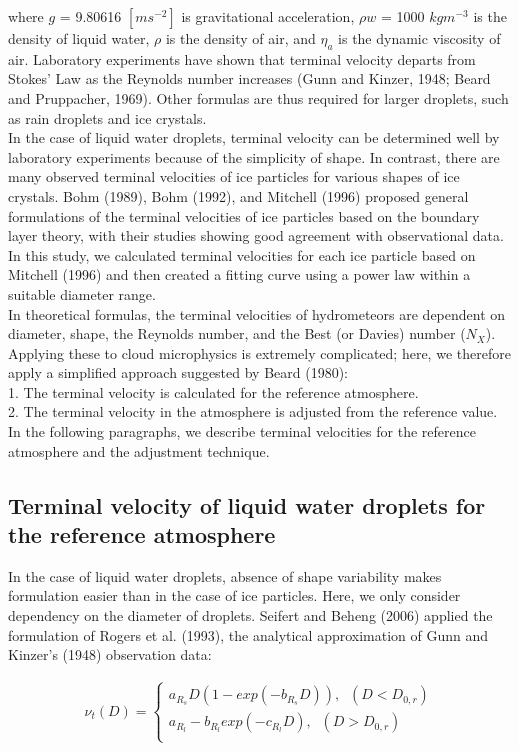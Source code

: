 where $g$ = 9.80616 $[m s^{-2}]$ is gravitational acceleration, $\rho w$ = 1000 $kg m^{-3}$ is the density of liquid water, $\rho$ is the density of air, and $\eta_{a}$ is the dynamic viscosity of air. Laboratory experiments have shown that terminal velocity departs from Stokes’ Law as the Reynolds number increases (Gunn and Kinzer, 1948; Beard and Pruppacher, 1969). Other formulas are thus required for larger droplets, such as rain droplets and ice crystals.\\
In the case of liquid water droplets, terminal velocity can be determined well by laboratory experiments because of the simplicity of shape. In contrast, there are many observed terminal velocities of ice particles for various shapes of ice crystals. Bohm (1989), Bohm (1992), and Mitchell (1996) proposed general formulations of the terminal velocities of ice particles based on the boundary layer theory, with their studies showing good agreement with observational data. In this study, we calculated terminal velocities for each ice particle based on Mitchell (1996) and then created a fitting curve using a power law within a suitable diameter range. \\
In theoretical formulas, the terminal velocities of hydrometeors are dependent on diameter, shape, the Reynolds number, and the Best (or Davies) number ($N_{X}$). Applying these to cloud microphysics is extremely complicated; here, we therefore apply a simplified approach suggested by Beard (1980):\\
1. The terminal velocity is calculated for the reference atmosphere.\\
2. The terminal velocity in the atmosphere is adjusted from the reference value.\\
In the following paragraphs, we describe terminal velocities for the reference atmosphere and the adjustment technique.

\subsection{Terminal velocity of liquid water droplets for the reference atmosphere}
In the case of liquid water droplets, absence of shape variability makes formulation easier than in the case of ice particles. Here, we only consider dependency on the diameter of droplets. Seifert and Beheng (2006) applied the formulation of Rogers et al. (1993), the analytical approximation of Gunn and Kinzer’s (1948) observation data:

\begin{eqnarray}
\nu_{t}(D)=
\left\{
\begin{array}{l}
a_{R_{s}}D(1-exp(-b_{R_{s}}D)),\;\;(D<D_{0,r}) \\
a_{R_{l}}-b_{R_{l}}exp(-c_{R_{l}}D),\;\;(D>D_{0,r}) \\
\label{sn13}
\end{array}
\right.
\end{eqnarray}

